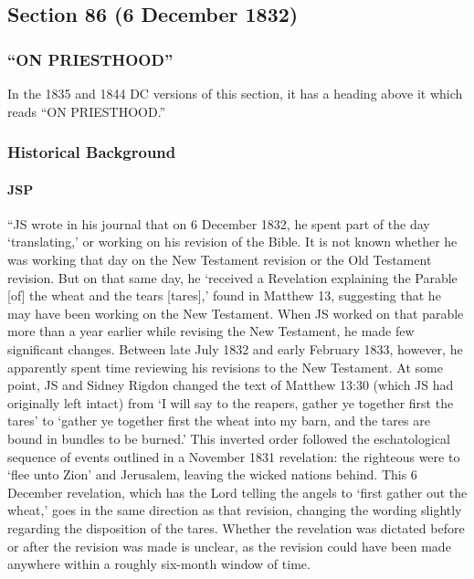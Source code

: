 \subsection{Section 86 (6 December 1832)}
	\label{DC86}
	
	\subsubsection{``ON PRIESTHOOD''}
	
		In the 1835 and 1844 DC versions of this section, it has a heading above it which reads ``ON PRIESTHOOD.''
	
	\subsubsection{Historical Background}
		\label{DC86-HB}
		
		\paragraph{JSP}
		
			``JS wrote in his journal that on 6 December 1832, he spent part of the day `translating,' or working on his revision of the Bible. It is not known whether he was working that day on the New Testament revision or the Old Testament revision. But on that same day, he `received a Revelation explaining the Parable [of] the wheat and the tears [tares],' found in Matthew 13, suggesting that he may have been working on the New Testament. When JS worked on that parable more than a year earlier while revising the New Testament, he made few significant changes. Between late July 1832 and early February 1833, however, he apparently spent time reviewing his revisions to the New Testament. At some point, JS and Sidney Rigdon changed the text of Matthew 13:30 (which JS had originally left intact) from `I will say to the reapers, gather ye together first the tares' to `gather ye together first the wheat into my barn, and the tares are bound in bundles to be burned.' This inverted order followed the eschatological sequence of events outlined in a November 1831 revelation: the righteous were to `flee unto Zion' and Jerusalem, leaving the wicked nations behind. This 6 December revelation, which has the Lord telling the angels to `first gather out the wheat,' goes in the same direction as that revision, changing the wording slightly regarding the disposition of the tares. Whether the revelation was dictated before or after the revision was made is unclear, as the revision could have been made anywhere within a roughly six-month window of time.


